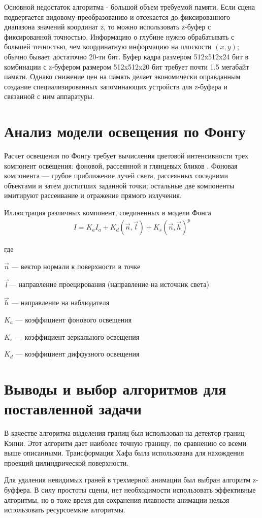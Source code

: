 Основной недостаток алгоритма - большой объем требуемой памяти. Если сцена подвергается видовому преобразованию и отсекается до фиксированного диапазона значений координат z, то можно использовать z-буфер с фиксированной точностью. Информацию о глубине нужно обрабатывать с большей точностью, чем координатную информацию на плоскости \((x, y)\); обычно бывает достаточно 20-ти бит. Буфер кадра размером 512x512x24 бит в комбинации с z-буфером размером 512x512x20 бит требует почти 1.5 мегабайт памяти. Однако снижение цен на память делает экономически оправданным создание специализированных запоминающих устройств для z-буфера и связанной с ним аппаратуры.

\section{Анализ модели освещения по Фонгу}
Расчет освещения по Фонгу требует вычисления цветовой интенсивности трех компонент освещения: фоновой, рассеянной  и глянцевых бликов . Фоновая компонента — грубое приближение лучей света, рассеянных соседними объектами и затем достигших заданной точки; остальные две компоненты имитируют рассеивание и отражение прямого излучения.

Иллюстрация различных компонент, соединенных в модели Фонга
\begin{gather}
{\displaystyle I=K_{a}I_{a}+K_{d}({\vec {n}},{\vec {l}})+K_{s}({\vec {n}},{\vec {h}})^{p}}
\end{gather}

где

\({\displaystyle {\vec {n}}} \) — вектор нормали к поверхности в точке

\({\displaystyle {\vec {l}}} \)— направление проецирования (направление на источник света)

\({\displaystyle {\vec {h}}} \) — направление на наблюдателя

\({\displaystyle K_{a}}\) — коэффициент фонового освещения

\({\displaystyle K_{s}} \) — коэффициент зеркального освещения

\({\displaystyle K_{d}}\) — коэффициент диффузного освещения

\section{Выводы и выбор алгоритмов для поставленной задачи}
В качестве алгоритма выделения границ был использован на детектор границ Кэнни. Этот алгоритм дает наиболее точную границу, по сравнению со всеми выше описанными. Трансформация Хафа была использована для нахождения проекций цилиндрической поверхности.

Для удаления невидимых граней в трехмерной анимации был выбран алгоритм z-буффера. В силу простоты сцены, нет необходимости использовать эффективные алгоритмы, но в тоже время для сохранения плавности анимации нельзя использовать ресурсоемкие алгоритмы.
